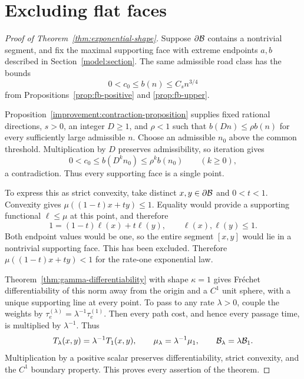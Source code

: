 \section{Excluding flat faces}
\label{conclusion:section}

\begin{proof}[Proof of Theorem~\ref{thm:exponential-shape}]
Suppose $\partial\mathcal B$ contains a nontrivial segment, and fix the
maximal supporting face with extreme endpoints $a,b$ described in
Section~\ref{model:section}. The same admissible road class has the
bounds
\[
 0<c_0\le b(n)\le C_s n^{3/4}
\]
from Propositions~\ref{prop:fb-positive} and \ref{prop:fb-upper}.

Proposition~\ref{improvement:contraction-proposition} supplies fixed
rational directions, $s>0$, an integer $D\ge1$, and $\rho<1$ such that
$b(Dn)\le\rho b(n)$ for every sufficiently large admissible $n$.
Choose an admissible $n_0$ above the common threshold. Multiplication
by $D$ preserves admissibility, so iteration gives
\[
 0<c_0\le b(D^k n_0)\le\rho^k b(n_0)
 \qquad(k\ge0),
\]
a contradiction. Thus every supporting face is a single point.

To express this as strict convexity, take distinct
$x,y\in\partial\mathcal B$ and $0<t<1$. Convexity gives
$\mu((1-t)x+ty)\le1$. Equality would provide a supporting functional
$\ell\le\mu$ at this point, and therefore
\[
 1=(1-t)\ell(x)+t\ell(y),\qquad \ell(x),\ell(y)\le1.
\]
Both endpoint values would be one, so the entire segment $[x,y]$
would lie in a nontrivial supporting face. This has been excluded.
Therefore $\mu((1-t)x+ty)<1$ for the rate-one exponential law.

Theorem~\ref{thm:gamma-differentiability} with shape $\kappa=1$
gives Fr\'echet differentiability of this norm away from the origin and
a $C^1$ unit sphere, with a unique supporting line at every point.
To pass to any rate $\lambda>0$, couple the weights by
$\tau_e^{(\lambda)}=\lambda^{-1}\tau_e^{(1)}$. Then every path cost,
and hence every passage time, is multiplied by $\lambda^{-1}$. Thus
\[
 T_\lambda(x,y)=\lambda^{-1}T_1(x,y),\qquad
 \mu_\lambda=\lambda^{-1}\mu_1,\qquad
 \mathcal B_\lambda=\lambda\mathcal B_1.
\]
Multiplication by a positive scalar preserves differentiability,
strict convexity, and the $C^1$ boundary property. This proves every
assertion of the theorem.
\end{proof}
